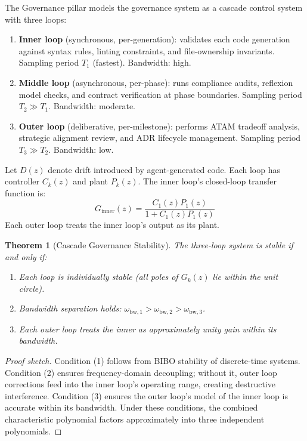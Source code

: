 \documentclass[11pt, a4paper, logo, copyright]{googledeepmind}
\newtheorem{theorem}{Theorem}[section]
\begin{document}
The Governance pillar models the governance system as a cascade control system with three loops:

\begin{enumerate}
    \item \textbf{Inner loop} (synchronous, per-generation): validates each code generation against syntax rules, linting constraints, and file-ownership invariants. Sampling period $T_1$ (fastest). Bandwidth: high.
    \item \textbf{Middle loop} (asynchronous, per-phase): runs compliance audits, reflexion model checks, and contract verification at phase boundaries. Sampling period $T_2 \gg T_1$. Bandwidth: moderate.
    \item \textbf{Outer loop} (deliberative, per-milestone): performs ATAM tradeoff analysis, strategic alignment review, and ADR lifecycle management. Sampling period $T_3 \gg T_2$. Bandwidth: low.
\end{enumerate}

Let $D(z)$ denote drift introduced by agent-generated code. Each loop has controller $C_k(z)$ and plant $P_k(z)$. The inner loop's closed-loop transfer function is:
\begin{equation}
    G_{\mathrm{inner}}(z) = \frac{C_1(z) P_1(z)}{1 + C_1(z) P_1(z)}
\end{equation}
Each outer loop treats the inner loop's output as its plant.

\begin{theorem}[Cascade Governance Stability]
\label{thm:cascade-stability}
The three-loop system is stable if and only if:
\begin{enumerate}
    \item Each loop is individually stable (all poles of $G_k(z)$ lie within the unit circle).
    \item Bandwidth separation holds: $\omega_{\mathrm{bw},1} > \omega_{\mathrm{bw},2} > \omega_{\mathrm{bw},3}$.
    \item Each outer loop treats the inner as approximately unity gain within its bandwidth.
\end{enumerate}
\end{theorem}

\begin{proof}[Proof sketch]
Condition (1) follows from BIBO stability of discrete-time systems. Condition (2) ensures frequency-domain decoupling; without it, outer loop corrections feed into the inner loop's operating range, creating destructive interference. Condition (3) ensures the outer loop's model of the inner loop is accurate within its bandwidth. Under these conditions, the combined characteristic polynomial factors approximately into three independent polynomials.
\end{proof}
\end{document}
